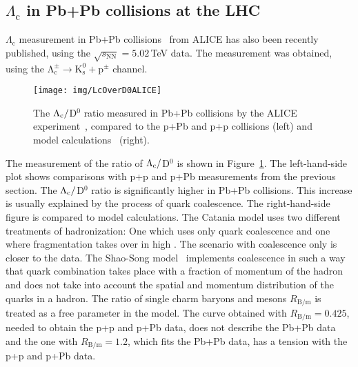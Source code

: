 % 

\subsection{$\Lambda_\mathrm{c}$ in Pb+Pb collisions at the LHC}

$\Lambda_\mathrm{c}$ measurement in Pb+Pb collisions~\cite{AlicePbPb} from ALICE has also been recently published, using the $\sqrt{s_\mathrm{NN}} = 5.02\,$TeV data. The measurement was obtained, using the $\mathrm{\Lambda_c^\pm \rightarrow K^0_s + p^\pm}$ channel.

\begin{figure}[!htb]
\centering
\texttt{[image: img/LcOverD0ALICE]}
\caption{The ${\Lambda_\text{c}}/$D$^0$ ratio measured in Pb+Pb collisions by the ALICE experiment~\cite{AlicePbPb}, compared to the p+Pb and p+p collisions (left) and model calculations~\cite{fragmentationAA, Catania, LcPPbModelShaoSong, ShaoSongPP,  ShaoSong} (right).}
\label{fig:LcD0ALICE}
\end{figure}

The measurement of the ratio of ${\Lambda_\text{c}}/$D$^0$ is shown in Figure~\ref{fig:LcD0ALICE}. The left-hand-side plot shows comparisons with p+p and p+Pb measurements from the previous section. The ${\Lambda_\text{c}}/$D$^0$ ratio is significantly higher in Pb+Pb collisions. This increase is usually explained by the process of quark coalescence. The right-hand-side figure is compared to model calculations. The Catania model uses two different treatments of hadronization: One which uses only quark coalescence and one where fragmentation takes over in high \pt\@. The scenario with coalescence only is closer to the data. The Shao-Song model~\cite{LcPPbModelShaoSong, ShaoSongPP} implements coalescence in such a way that quark combination takes place with a fraction of momentum of the hadron and does not take into account the spatial and momentum distribution of the quarks in a hadron. The ratio of single charm baryons and mesons $R_\mathrm{B/m}$ is treated as a free parameter in the model. The curve obtained with  $R_\mathrm{B/m} = 0.425$, needed to obtain the p+p and p+Pb data, does not describe the Pb+Pb data and the one with $R_\mathrm{B/m} = 1.2$, which fits the Pb+Pb data, has a tension with the p+p and p+Pb data.

